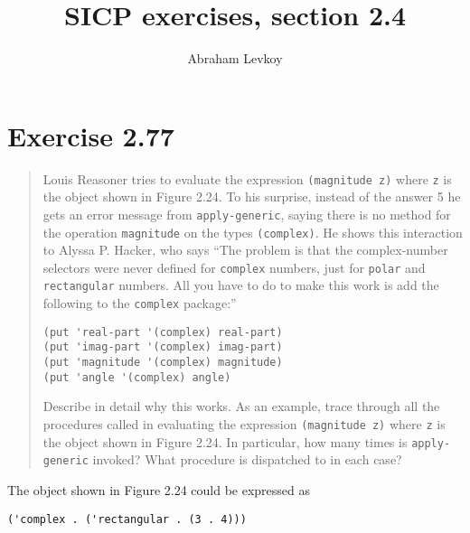 \documentclass{article}
\author{Abraham Levkoy}
\title{SICP exercises, section 2.4}
\begin{document}
\maketitle

\section{Exercise 2.77}
\begin{quote}
    Louis Reasoner tries to evaluate the expression \texttt{(magnitude z)} where
    \texttt{z} is the object shown in Figure 2.24. To his surprise, instead of
    the answer 5 he gets an error message from \texttt{apply-generic}, saying
    there is no method for the operation \texttt{magnitude} on the types
    \texttt{(complex)}. He shows this interaction to Alyssa P. Hacker, who says
    ``The problem is that the complex-number selectors were never defined for
    \texttt{complex} numbers, just for \texttt{polar} and \texttt{rectangular}
    numbers. All you have to do to make this work is add the following to the
    \texttt{complex} package:''
    \begin{lstlisting}
(put 'real-part '(complex) real-part)
(put 'imag-part '(complex) imag-part)
(put 'magnitude '(complex) magnitude)
(put 'angle '(complex) angle)
    \end{lstlisting}

    Describe in detail why this works. As an example, trace through all the
    procedures called in evaluating the expression \texttt{(magnitude z)} where
    \texttt{z} is the object shown in Figure 2.24. In particular, how many times
    is \texttt{apply-generic} invoked? What procedure is dispatched to in each
    case?
\end{quote}

The object shown in Figure 2.24 could be expressed as
\begin{lstlisting}
('complex . ('rectangular . (3 . 4)))
\end{lstlisting}
\end{document}
